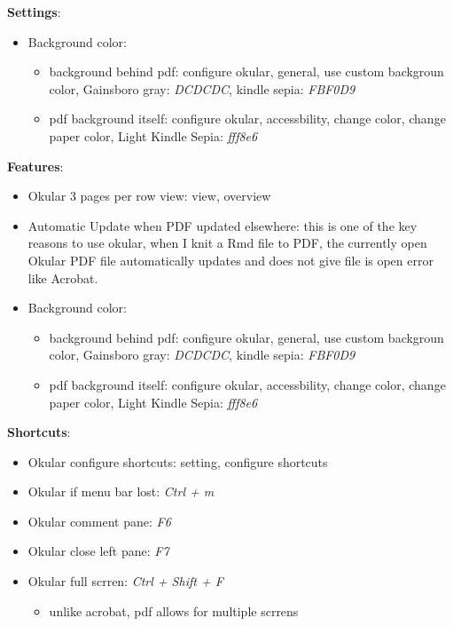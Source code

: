 \documentclass[]{article}
\providecommand{\tightlist}{%
  \setlength{\itemsep}{0pt}\setlength{\parskip}{0pt}}
\begin{document}
\textbf{Settings}:

\begin{itemize}
\tightlist
\item
  Background color:

  \begin{itemize}
  \tightlist
  \item
    background behind pdf: configure okular, general, use custom
    backgroun color, Gainsboro gray: \emph{DCDCDC}, kindle sepia:
    \emph{FBF0D9}
  \item
    pdf background itself: configure okular, accessbility, change color,
    change paper color, Light Kindle Sepia: \emph{fff8e6}
  \end{itemize}
\end{itemize}

\textbf{Features}:

\begin{itemize}
\tightlist
\item
  Okular 3 pages per row view: view, overview
\item
  Automatic Update when PDF updated elsewhere: this is one of the key
  reasons to use okular, when I knit a Rmd file to PDF, the currently
  open Okular PDF file automatically updates and does not give file is
  open error like Acrobat.
\item
  Background color:

  \begin{itemize}
  \tightlist
  \item
    background behind pdf: configure okular, general, use custom
    backgroun color, Gainsboro gray: \emph{DCDCDC}, kindle sepia:
    \emph{FBF0D9}
  \item
    pdf background itself: configure okular, accessbility, change color,
    change paper color, Light Kindle Sepia: \emph{fff8e6}
  \end{itemize}
\end{itemize}

\textbf{Shortcuts}:

\begin{itemize}
\tightlist
\item
  Okular configure shortcuts: setting, configure shortcuts
\item
  Okular if menu bar lost: \emph{Ctrl + m}
\item
  Okular comment pane: \emph{F6}
\item
  Okular close left pane: \emph{F7}
\item
  Okular full scrren: \emph{Ctrl + Shift + F}

  \begin{itemize}
  \tightlist
  \item
    unlike acrobat, pdf allows for multiple scrrens
  \end{itemize}
\end{itemize}
\end{document}
